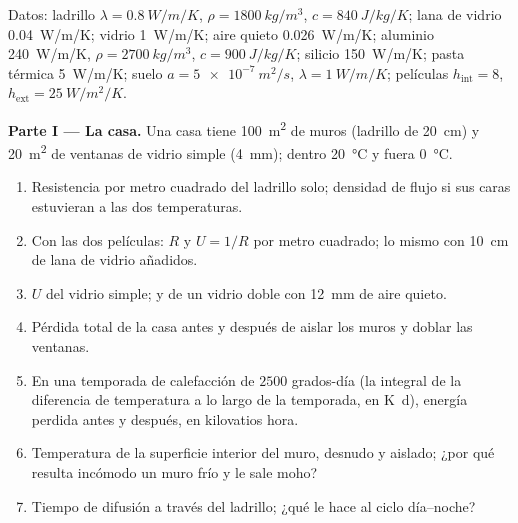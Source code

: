 \begin{problem}\label{pb:b2:heat-conduction:1}
Datos: ladrillo $\lambda = \qty{0.8}{W/m/K}$, $\rho = \qty{1800}{kg/m^3}$, $c =
\qty{840}{J/kg/K}$; lana de vidrio \qty{0.04}{W/m/K}; vidrio \qty{1}{W/m/K}; aire
quieto \qty{0.026}{W/m/K}; aluminio \qty{240}{W/m/K}, $\rho = \qty{2700}{kg/m^3}$,
$c = \qty{900}{J/kg/K}$; silicio \qty{150}{W/m/K}; pasta térmica
\qty{5}{W/m/K}; suelo $a = \qty{5e-7}{m^2/s}$, $\lambda = \qty{1}{W/m/K}$;
películas $h_{\text{int}} = 8$, $h_{\text{ext}} = \qty{25}{W/m^2/K}$.

\textbf{Parte I --- La casa.}
Una casa tiene \qty{100}{m^2} de muros (ladrillo de \qty{20}{cm}) y \qty{20}{m^2}
de ventanas de vidrio simple (\qty{4}{mm}); dentro \qty{20}{\celsius} y
fuera \qty{0}{\celsius}.
\begin{enumerate}
  \item Resistencia por metro cuadrado del ladrillo solo; densidad de flujo
        si sus caras estuvieran a las dos temperaturas.
  \item Con las dos películas: $R$ y $U = 1/R$ por metro cuadrado; lo mismo
        con \qty{10}{cm} de lana de vidrio añadidos.
  \item $U$ del vidrio simple; y de un vidrio doble con \qty{12}{mm}
        de aire quieto.
  \item Pérdida total de la casa antes y después de aislar los muros
        y doblar las ventanas.
  \item En una temporada de calefacción de $2500$ grados-día (la integral de
        la diferencia de temperatura a lo largo de la temporada, en \unit{K.d}),
        energía perdida antes y después, en kilovatios hora.
  \item Temperatura de la superficie interior del muro, desnudo y aislado;
        ¿por qué resulta incómodo un muro frío y le sale moho?
  \item Tiempo de difusión a través del ladrillo; ¿qué le hace al
        ciclo día--noche?
\end{enumerate}


\end{problem}
